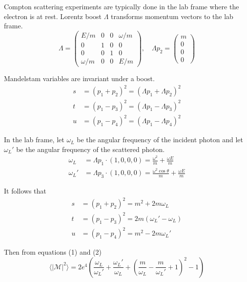 \documentclass[12pt]{article}
\begin{document}
Compton scattering experiments are typically done in the lab frame where the electron is at rest.
Lorentz boost $\Lambda$ transforms momentum vectors to the lab frame.
\begin{equation*}
\Lambda=
\begin{pmatrix}
E/m & 0 & 0 & \omega/m\\
0 & 1 & 0 & 0\\
0 & 0 & 1 & 0\\
\omega/m & 0 & 0 & E/m
\end{pmatrix},
\quad
\Lambda p_2=\begin{pmatrix}m \\ 0 \\ 0 \\ 0\end{pmatrix}
\end{equation*}

Mandelstam variables are invariant under a boost.
\begin{equation*}
\begin{aligned}
s&=(p_1+p_2)^2=(\Lambda p_1+\Lambda p_2)^2
\\
t&=(p_1-p_3)^2=(\Lambda p_1-\Lambda p_3)^2
\\
u&=(p_1-p_4)^2=(\Lambda p_1-\Lambda p_4)^2
\end{aligned}
\end{equation*}

In the lab frame, let $\omega_L$ be the angular frequency of the incident photon
and let $\omega_L'$ be the angular frequency of the scattered photon.
\begin{equation*}
\begin{aligned}
\omega_L&=\Lambda p_1\cdot(1,0,0,0)=\frac{\omega^2}{m}+\frac{\omega E}{m}
\\
\omega_L'&=\Lambda p_3\cdot(1,0,0,0)=\frac{\omega^2\cos\theta}{m}+\frac{\omega E}{m}
\end{aligned}
\end{equation*}

It follows that
\begin{equation*}
\begin{aligned}
s&=(p_1+p_2)^2=m^2+2m\omega_L
\\
t&=(p_1-p_3)^2=2m(\omega_L' - \omega_L)
\\
u&=(p_1-p_4)^2=m^2-2 m \omega_L'
\end{aligned}
\end{equation*}

Then from equations (1) and (2)
\begin{equation*}
\langle|\mathcal{M}|^2\rangle=
2e^4\left(
\frac{\omega_L}{\omega_L'}+\frac{\omega_L'}{\omega_L}
+\left(\frac{m}{\omega_L}-\frac{m}{\omega_L'}+1\right)^2-1
\right)
\end{equation*}
\end{document}
